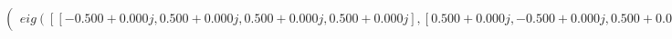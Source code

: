 \documentclass[border=1em]{standalone}
\begin{document}
$
\left(
\begin{array}{cccc}
eig([[-0.500+0.000j, 0.500+0.000j, 0.500+0.000j, 0.500+0.000j],[0.500+0.000j, -0.500+0.000j, 0.500+0.000j, 0.500+0.000j],[0.500+0.000j, 0.500+0.000j, -0.500+0.000j, 0.500+0.000j],[0.500+0.000j, 0.500+0.000j, 0.500+0.000j, -0.500+0.000j]])
\end{array}
\right)
$
\end{document}
